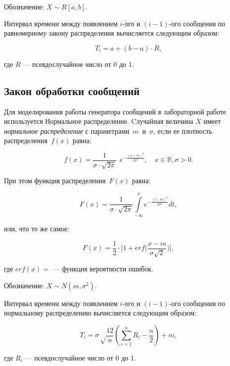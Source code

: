 Обозначение: $X \sim R[a, b]$.

Интервал времени между появлением $i$-ого и $(i - 1)$-ого сообщения по равномерному закону распределения вычисляется следующим образом:

\begin{equation}
	T_{i} = a + (b - a) \cdot R,
\end{equation}

\noindent где $R$ --- псевдослучайное число от 0 до 1.

\subsection*{Закон обработки сообщений}

Для моделирования работы генератора сообщений в лабораторной работе используется Нормальное распределение.
Cлучайная величина $X$ имеет \textit{нормальное распределение} с
параметрами~$m$~и~$\sigma$, если ее плотность распределения~$f(x)$ равна:

\begin{equation}
	f(x) = \frac{1}{\sigma \cdot \sqrt{2\pi}}~~e^{\displaystyle-\frac{(x -
			m)^2}{2\sigma^2}}, \quad x \in \mathbb{R}, \sigma > 0.
\end{equation}

При этом функция распределения~$F(x)$ равна:

\begin{equation}
	F(x) = \frac{1}{\sigma \cdot \sqrt{2\pi}} \int\limits_{-\infty}^{x}
	e^{\displaystyle-\frac{(t - m)^2}{2\sigma^2}} dt,
\end{equation}

или, что то же самое:

\begin{equation}
	F(x) = \frac{1}{2} \cdot \bigg[1 + erf\bigg(\frac{x - m}{\sigma
		\sqrt{2}}\bigg)\bigg],
\end{equation}

где $erf(x) = $ 
 --- функция вероятности
ошибок.

Обозначение: $X \sim N(m, \sigma^2)$. 

Интервал времени между появлением $i$-ого и $(i - 1)$-ого сообщения по нормальному распределению вычисляется следующим образом:

\begin{equation}
	T_i = \sigma \sqrt\frac{12}{n}(\sum\limits_{i=1}^{n} R_i - \frac{n}{2}) + m,
\end{equation}

\noindent где $R_i$ --- псевдослучайное число от 0 до 1.
